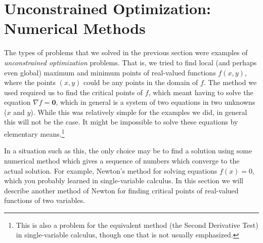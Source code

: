 \section{Unconstrained Optimization: Numerical Methods}
The types of problems that we solved in the previous section were examples of \emph{unconstrained optimization}
problems. That is, we tried to find local (and perhaps even global) maximum and minimum points of real-valued
functions $f(x,y)$, where the points $(x,y)$ could be any points in the domain of $f$. 
The method we used required us to find the critical points of $f$, which meant having to solve the equation
$\nabla f = \textbf{0}$, which in general is a system of two equations in two unknowns ($x$ and $y$). 
While this was relatively simple for the examples we did, in general this will not be the case. 
It might be impossible to solve these equations 
by elementary means.\footnote{This is also a problem
for the equivalent method (the Second Derivative Test) in single-variable calculus, though one that is not usually
emphasized.}

In a situation such as this, the
only choice may be to find a solution using some numerical method which gives a sequence of numbers which
converge to the actual solution. For example, Newton's method for solving equations $f(x) = 0$, which you probably
learned in single-variable calculus. In this section we will describe another method of Newton for
finding critical points of real-valued functions of two variables.

